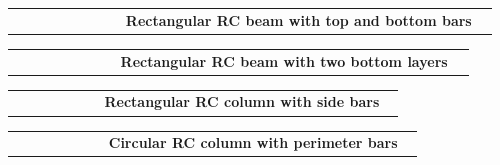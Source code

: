 \documentclass[11pt]{article}
\makeatletter
\newcommand{\ExampleRow}[3]{%
  \begin{tabular}{@{}m{0.22\linewidth}m{0.74\linewidth}@{}}
    \begin{tikzpicture}[baseline=(current bounding box.center)]
      #3
    \end{tikzpicture}
    &
    \textbf{#1}\par
    \vspace{2pt}
    {\raggedright\ttfamily\scriptsize\detokenize{#2}\par}
  \end{tabular}
  \par\vspace{8mm}
}
\makeatother
\begin{document}
\ExampleRow
  {Rectangular RC beam with top and bottom bars}
  {\TikZRCRectangular[width=300, depth=500, cover=40, bar diameter=18, top bars=2, bottom bars=3, scale=0.025]}
  {\TikZRCRectangular[width=300, depth=500, cover=40, bar diameter=18, top bars=2, bottom bars=3, scale=0.025]}

\ExampleRow
  {Rectangular RC beam with two bottom layers}
  {\TikZRCRectangular[width=300, depth=550, cover=40, bar diameter=18, top bars=2, bottom bars=3, bottom layers=2, layer spacing=28, scale=0.025]}
  {\TikZRCRectangular[width=300, depth=550, cover=40, bar diameter=18, top bars=2, bottom bars=3, bottom layers=2, layer spacing=28, scale=0.025]}

\ExampleRow
  {Rectangular RC column with side bars}
  {\TikZRCRectangular[width=400, depth=400, cover=45, bar diameter=20, top bars=3, bottom bars=3, left bars=2, right bars=2, scale=0.025]}
  {\TikZRCRectangular[width=400, depth=400, cover=45, bar diameter=20, top bars=3, bottom bars=3, left bars=2, right bars=2, scale=0.025]}

\ExampleRow
  {Circular RC column with perimeter bars}
  {\TikZRCCircular[diameter=450, cover=45, bar diameter=20, perimeter bars=10, scale=0.025]}
  {\TikZRCCircular[diameter=450, cover=45, bar diameter=20, perimeter bars=10, scale=0.025]}
\end{document}

